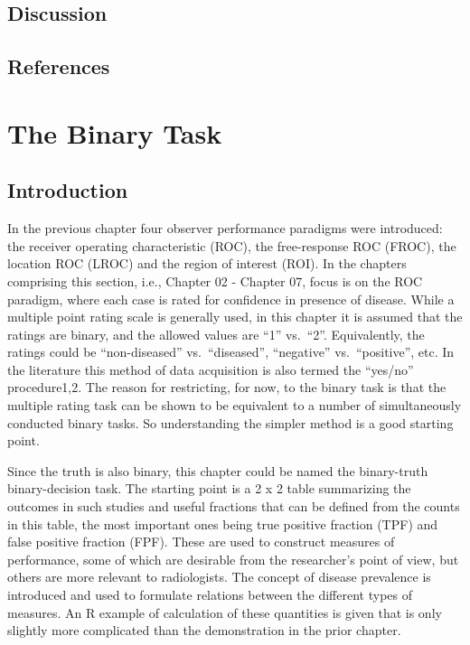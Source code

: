 \documentclass[
]{book}
\begin{document}
\hypertarget{frocdataformat-Discussion}{%
\section{Discussion}\label{frocdataformat-Discussion}}

\hypertarget{frocdataformat-references}{%
\section{References}\label{frocdataformat-references}}

\hypertarget{binaryTask0}{%
\chapter{The Binary Task}\label{binaryTask0}}

\hypertarget{binaryTask0Intro}{%
\section{Introduction}\label{binaryTask0Intro}}

In the previous chapter four observer performance paradigms were introduced: the receiver operating characteristic (ROC), the free-response ROC (FROC), the location ROC (LROC) and the region of interest (ROI). In the chapters comprising this section, i.e., Chapter 02 - Chapter 07, focus is on the ROC paradigm, where each case is rated for confidence in presence of disease. While a multiple point rating scale is generally used, in this chapter it is assumed that the ratings are binary, and the allowed values are ``1'' vs.~``2''. Equivalently, the ratings could be ``non-diseased'' vs.~``diseased'', ``negative'' vs.~``positive'', etc. In the literature this method of data acquisition is also termed the ``yes/no'' procedure1,2. The reason for restricting, for now, to the binary task is that the multiple rating task can be shown to be equivalent to a number of simultaneously conducted binary tasks. So understanding the simpler method is a good starting point.

Since the truth is also binary, this chapter could be named the binary-truth binary-decision task. The starting point is a 2 x 2 table summarizing the outcomes in such studies and useful fractions that can be defined from the counts in this table, the most important ones being true positive fraction (TPF) and false positive fraction (FPF). These are used to construct measures of performance, some of which are desirable from the researcher's point of view, but others are more relevant to radiologists. The concept of disease prevalence is introduced and used to formulate relations between the different types of measures. An R example of calculation of these quantities is given that is only slightly more complicated than the demonstration in the prior chapter.
\end{document}
